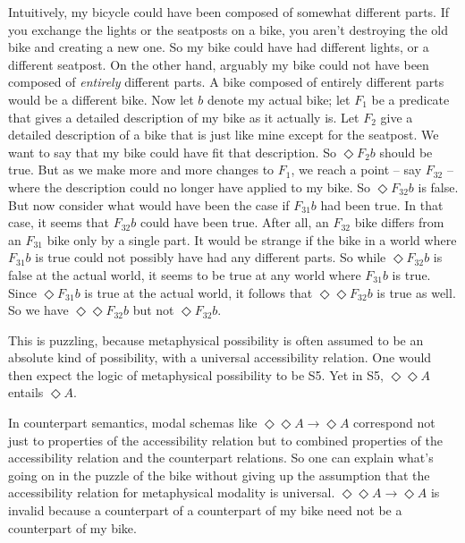 Intuitively, my bicycle could have been composed of somewhat different parts. If
you exchange the lights or the seatposts on a bike, you aren't destroying the
old bike and creating a new one. So my bike could have had different lights, or
a different seatpost. On the other hand, arguably my bike could not have been
composed of \emph{entirely} different parts. A bike composed of entirely
different parts would be a different bike. Now let $b$ denote my actual bike;
let $F_1$ be a predicate that gives a detailed description of my bike as it
actually is. Let $F_2$ give a detailed description of a bike that is just like
mine except for the seatpost. We want to say that my bike could have fit that
description. So $\Diamond F_2b$ should be true. But as we make more and more
changes to $F_1$, we reach a point -- say $F_{32}$ -- where the description could
no longer have applied to my bike. So $\Diamond F_{32}b$ is false. But now
consider what would have been the case if $F_{31}b$ had been true. In that case,
it seems that $F_{32}b$ could have been true. After all, an $F_{32}$ bike differs
from an $F_{31}$ bike only by a single part. It would be strange if the bike in a
world where $F_{31}b$ is true could not possibly have had any different parts. So
while $\Diamond F_{32}b$ is false at the actual world, it seems to be true at any
world where $F_{31}b$ is true. Since $\Diamond F_{31}b$ is true at the
actual world, it follows that $\Diamond\Diamond F_{32}b$ is true as well. So we
have $\Diamond\Diamond F_{32}b$ but not $\Diamond F_{32}b$.

This is puzzling, because metaphysical possibility is often assumed to be an
absolute kind of possibility, with a universal accessibility relation. One would
then expect the logic of metaphysical possibility to be S5. Yet in S5,
$\Diamond\Diamond A$ entails $\Diamond A$.

In counterpart semantics, modal schemas like
$\Diamond \Diamond A \to \Diamond A$ correspond not just to properties of the
accessibility relation but to combined properties of the accessibility relation
and the counterpart relations. So one can explain what's going on in the puzzle
of the bike without giving up the assumption that the accessibility relation for
metaphysical modality is universal. $\Diamond \Diamond A \to \Diamond A$ is
invalid because a counterpart of a counterpart of my bike need not be a
counterpart of my bike.

\fi


